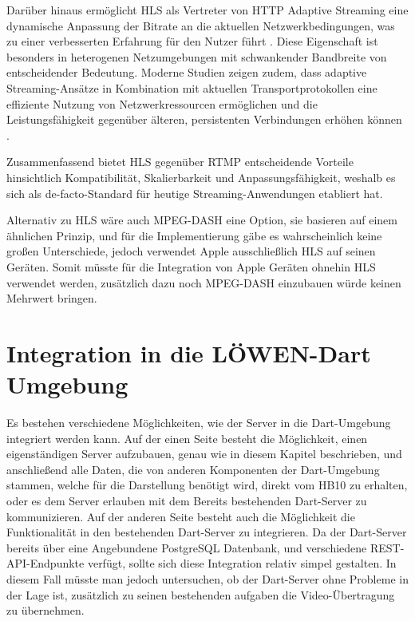 Darüber hinaus ermöglicht \ac{HLS} als Vertreter von HTTP Adaptive Streaming eine dynamische Anpassung der Bitrate an die aktuellen Netzwerkbedingungen, was zu einer verbesserten Erfahrung für den Nutzer führt \cite{Saini2026}. 
Diese Eigenschaft ist besonders in heterogenen Netzumgebungen mit schwankender Bandbreite von entscheidender Bedeutung. Moderne Studien zeigen zudem, dass adaptive Streaming-Ansätze in Kombination mit aktuellen Transportprotokollen eine effiziente Nutzung von Netzwerkressourcen ermöglichen 
und die Leistungsfähigkeit gegenüber älteren, persistenten Verbindungen erhöhen können \cite{10.1145/3793674}. 

Zusammenfassend bietet HLS gegenüber RTMP entscheidende Vorteile hinsichtlich Kompatibilität, Skalierbarkeit und Anpassungsfähigkeit, weshalb es sich als de-facto-Standard für heutige Streaming-Anwendungen etabliert hat.

Alternativ zu HLS wäre auch MPEG-DASH \parencite{Saini2026} eine Option, sie basieren auf einem ähnlichen Prinzip, und für die Implementierung gäbe es wahrscheinlich keine großen Unterschiede, jedoch verwendet Apple ausschließlich HLS auf seinen Geräten.
Somit müsste für die Integration von Apple Geräten ohnehin HLS verwendet werden, zusätzlich dazu noch MPEG-DASH einzubauen würde keinen Mehrwert bringen.

\section{Integration in die LÖWEN-Dart Umgebung}

Es bestehen verschiedene Möglichkeiten, wie der Server in die Dart-Umgebung integriert werden kann. Auf der einen Seite besteht die Möglichkeit, einen eigenständigen Server aufzubauen, genau wie in diesem Kapitel beschrieben,
und anschließend alle Daten, die von anderen Komponenten der Dart-Umgebung stammen, welche für die Darstellung benötigt wird, direkt vom HB10 zu erhalten, oder es dem Server erlauben mit dem Bereits bestehenden Dart-Server zu kommunizieren.
Auf der anderen Seite besteht auch die Möglichkeit die Funktionalität in den bestehenden Dart-Server zu integrieren. Da der Dart-Server bereits über eine Angebundene PostgreSQL Datenbank, und verschiedene REST-API-Endpunkte verfügt, sollte sich diese Integration relativ simpel gestalten.
In diesem Fall müsste man jedoch untersuchen, ob der Dart-Server ohne Probleme in der Lage ist, zusätzlich zu seinen bestehenden aufgaben die Video-Übertragung zu übernehmen.

